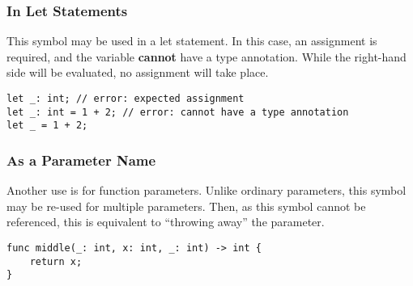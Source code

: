 \subsubsection{In Let Statements}

This symbol may be used in a let statement.
In this case, an assignment is required, and the variable \textbf{cannot} have a type annotation.
While the right-hand side will be evaluated, no assignment will take place.

\begin{lstlisting}[language=CustomLang]
let _: int; // error: expected assignment
let _: int = 1 + 2; // error: cannot have a type annotation
let _ = 1 + 2;
\end{lstlisting}

\subsubsection{As a Parameter Name}

Another use is for function parameters.
Unlike ordinary parameters, this symbol may be re-used for multiple parameters.
Then, as this symbol cannot be referenced, this is equivalent to ``throwing away'' the parameter.

\begin{lstlisting}[language=CustomLang]
func middle(_: int, x: int, _: int) -> int {
    return x;
}
\end{lstlisting}
